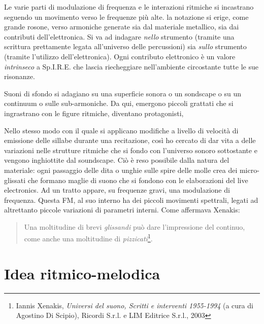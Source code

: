 Le varie parti di modulazione di frequenza e le interazioni ritmiche si incastrano seguendo un movimento verso le frequenze più alte. la notazione si erige, come grande rosone, verso armoniche generate sia dal materiale metallico, sia dai contributi dell'elettronica.  Si va ad indagare \textit{nello} strumento (tramite una scrittura prettamente legata all'universo delle percussioni) sia \textit{sullo} strumento (tramite l'utilizzo dell'elettronica). Ogni contributo elettronico è un valore \textit{intrinseco} a Sp.I.R.E. che lascia riecheggiare nell'ambiente circostante tutte le sue risonanze.

Suoni di sfondo si adagiano su una superficie sonora o un sondscape o su un continuum o sulle sub-armoniche. Da qui, emergono piccoli grattati che si ingrastrano con le figure ritmiche, diventano protagonisti, 

Nello stesso modo con il quale si applicano modifiche a livello di velocità di emissione delle sillabe durante una recitazione, così ho cercato di dar vita a delle variazioni nelle strutture ritmiche che si fondo con l'universo sonoro sottostante e vengono inghiottite dal soundscape. Ciò è reso possibile dalla natura del materiale: ogni passaggio delle dita o unghie sulle spire delle molle crea dei micro-glissati che formano maglie di suono che si fondono con le elaborazioni del live electronics. Ad un tratto appare, su frequenze gravi, una modulazione di frequenza. Questa FM, al suo interno ha dei piccoli movimenti spettrali, legati ad altrettanto piccole variazioni di parametri interni. Come affermava Xenakis:

\begin{quotation}
Una moltitudine di brevi \textit{glissandi} può dare l'impressione del continuo, come anche una moltitudine di \textit{pizzicati}\footnote{Iannis Xenakis, \textit{Universi del suono, Scritti e interventi 1955-1994} (a cura di Agostino Di Scipio), Ricordi S.r.l. e LIM Editrice S.r.l., 2003}.
\end{quotation}


\section{Idea ritmico-melodica}

